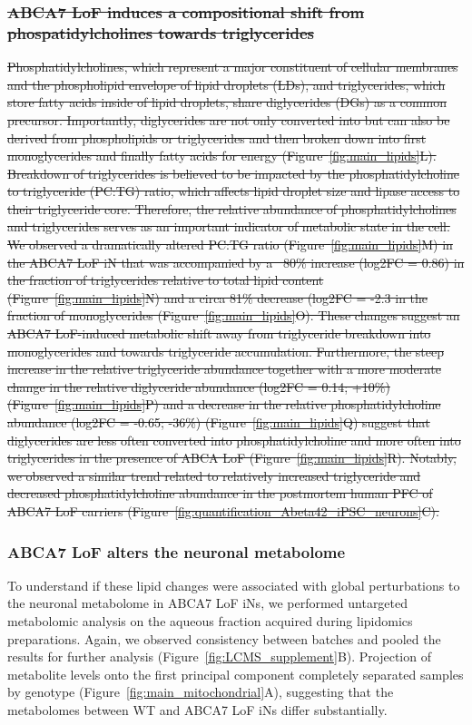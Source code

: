 \subsubsection{\sout{ABCA7 LoF induces a compositional shift from phospatidylcholines towards triglycerides}}
\sout{Phosphatidylcholines, which represent a major constituent of cellular membranes and the phospholipid envelope of lipid droplets (LDs), and triglycerides, which store fatty acids inside of lipid droplets, share diglycerides (DGs) as a common precursor\cite{Tomioka2017-nv,Picataggi2022-yp}. Importantly, diglycerides are not only converted into but can also be derived from phospholipids or triglycerides and then broken down into first monoglycerides and finally fatty acids for energy (Figure~\ref{fig:main_lipids}L). Breakdown of triglycerides is believed to be impacted by the phosphatidylcholine to triglyceride (PC:TG) ratio, which affects lipid droplet size and lipase access to their triglyceride core\cite{Krahmer2011-xy,Guo2008-xt,Fei2011-bl,Schott2019-zq}. Therefore, the relative abundance of phosphatidylcholines and triglycerides serves as an important indicator of metabolic state in the cell. We observed a dramatically altered PC:TG ratio (Figure~\ref{fig:main_lipids}M) in the ABCA7 LoF iN that was accompanied by a ~80\% increase (log2FC = 0.86) in the fraction of triglycerides relative to total lipid content (Figure~\ref{fig:main_lipids}N) and a circa 81\% decrease (log2FC = -2.3 in the fraction of monoglycerides (Figure~\ref{fig:main_lipids}O). These changes suggest an ABCA7 LoF-induced metabolic shift away from triglyceride breakdown into monoglycerides and towards triglyceride accumulation. Furthermore, the steep increase in the relative triglyceride abundance together with a more moderate change in the relative diglyceride abundance (log2FC = 0.14; +10\%) (Figure~\ref{fig:main_lipids}P) and a decrease in the relative phosphatidylcholine abundance (log2FC = -0.65; -36\%) (Figure~\ref{fig:main_lipids}Q) suggest that diglycerides are less often converted into phosphatidylcholine and more often into triglycerides in the presence of ABCA LoF (Figure~\ref{fig:main_lipids}R). Notably, we observed a similar trend related to relatively increased triglyceride and decreased phosphatidylcholine abundance in the postmortem human PFC of ABCA7 LoF carriers (Figure~\ref{fig:quantification_Abeta42_iPSC_neurons}C).} 

\subsubsection{ABCA7 LoF alters the neuronal metabolome}
To understand if these lipid changes were associated with global perturbations to the neuronal metabolome in ABCA7 LoF iNs, we performed untargeted metabolomic analysis on the aqueous fraction acquired during lipidomics preparations. Again, we observed consistency between batches and pooled the results for further analysis (Figure~\ref{fig:LCMS_supplement}B). Projection of metabolite levels onto the first principal component completely separated samples by genotype (Figure~\ref{fig:main_mitochondrial}A), suggesting that the metabolomes between WT and ABCA7 LoF iNs differ substantially. 

